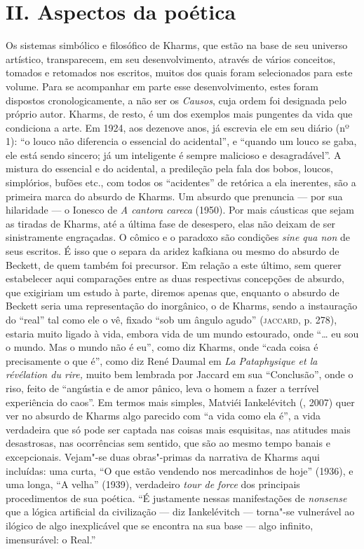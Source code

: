 \section{II. Aspectos da poética}

Os sistemas simbólico e filosófico de Kharms, que estão na base de seu
universo artístico, transparecem, em seu desenvolvimento, através de
vários conceitos, tomados e retomados nos escritos, muitos dos quais
foram selecionados para este volume. Para se acompanhar em parte esse
desenvolvimento, estes foram dispostos cronologicamente, a não ser os
\emph{Causos}, cuja ordem foi designada pelo próprio autor. Kharms, de
resto, é um dos exemplos mais pungentes da vida que condiciona a arte.
Em 1924, aos dezenove anos, já escrevia ele em seu diário (nº 1): ``o
louco não diferencia o essencial do acidental'', e ``quando um louco se
gaba, ele está sendo sincero; já um inteligente é sempre malicioso e
desagradável''. A mistura do essencial e do acidental, a predileção pela
fala dos bobos, loucos, simplórios, bufões etc., com todos os
``acidentes'' de retórica a ela inerentes, são a primeira marca do
absurdo de Kharms. Um absurdo que prenuncia --- por sua hilaridade --- o
Ionesco de \emph{A cantora careca} (1950). Por mais cáusticas que sejam
as tiradas de Kharms, até a última fase de desespero, elas não deixam de
ser sinistramente engraçadas. O cômico e o paradoxo são condições
\emph{sine qua non} de seus escritos. É isso que o separa da aridez
kafkiana ou mesmo do absurdo de Beckett, de quem também foi precursor.
Em relação a este último, sem querer estabelecer aqui comparações entre
as duas respectivas concepções de absurdo, que exigiriam um estudo à
parte, diremos apenas que, enquanto o absurdo de Beckett seria uma
representação do inorgânico, o de Kharms, sendo a instauração do
``real'' tal como ele o vê, fixado ``sob um ângulo agudo''
(\textsc{jaccard}, p. 278), estaria muito ligado à vida, embora vida de
um mundo estourado, onde ``\ldots{} eu sou o mundo. Mas o mundo não é eu'',
como diz Kharms, onde ``cada coisa é precisamente o que é'', como diz
René Daumal em \emph{La Pataphysique et la révélation du rire,} muito
bem lembrada por Jaccard em sua ``Conclusão'', onde o riso, feito de
``angústia e de amor pânico, leva o homem a fazer a terrível experiência
do caos''. Em termos mais simples, Matviéi Iankelévitch (,
2007) quer ver no absurdo de Kharms algo parecido com ``a vida como ela
é'', a vida verdadeira que só pode ser captada nas coisas mais
esquisitas, nas atitudes mais desastrosas, nas ocorrências sem sentido,
que são ao mesmo tempo banais e excepcionais. Vejam"-se duas obras"-primas
da narrativa de Kharms aqui incluídas: uma curta, ``O que estão vendendo
nos mercadinhos de hoje'' (1936), e uma longa, ``A velha'' (1939),
verdadeiro \emph{tour de force} dos principais procedimentos de sua
poética. ``É justamente nessas manifestações de \emph{nonsense} que a
lógica artificial da civilização --- diz Iankelévitch --- torna"-se
vulnerável ao ilógico de algo inexplicável que se encontra na sua base
--- algo infinito, imensurável: o Real.''

